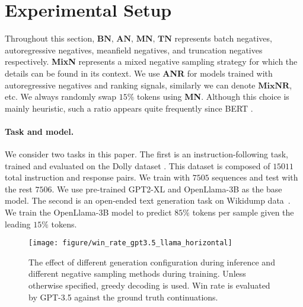 \section{Experimental Setup}

Throughout this section, $\textbf{BN, AN, MN, TN}$ represents batch negatives, autoregressive negatives, meanfield negatives, and truncation negatives respectively. \textbf{MixN} represents a mixed negative sampling strategy for which the details can be found in its context. We use \textbf{ANR} for models trained with autoregressive negatives and ranking signals, similarly we can denote $\textbf{MixNR}$, etc. We always randomly swap $15\%$ tokens using \textbf{MN}. Although this choice is mainly heuristic, such a ratio appears quite frequently since BERT \citep{wettig2022should}.

\vspace{-5pt}
\paragraph{Task and model.} We consider two tasks in this paper. The first is an instruction-following task, trained and evaluated on the Dolly dataset \citep{DatabricksBlog2023DollyV2}. This dataset is composed of $15011$ total instruction and response pairs. We train with $7505$ sequences and test with the rest $7506$. We use pre-trained GPT2-XL \citep{radford2019language} and OpenLlama-3B\citep{touvron2023llama,openlm2023openllama} as the base model. The second is an open-ended text generation task on Wikidump data~\citep{wikidump}. We train the OpenLlama-3B model to predict $85\%$ tokens per sample given the leading $15\%$ tokens.

\begin{figure}[tb]
\centering
	\texttt{[image: figure/win\_rate\_gpt3.5\_llama\_horizontal]}
 \vspace{-0.5em}
	\caption{The effect of different generation configuration during inference and different negative sampling methods during training. Unless otherwise specified, greedy decoding is used. Win rate is evaluated by GPT-3.5 against the ground truth continuations.}
	\label{fig:llama_comparison_neg_sample}	
\end{figure}

\vspace{-5pt}
